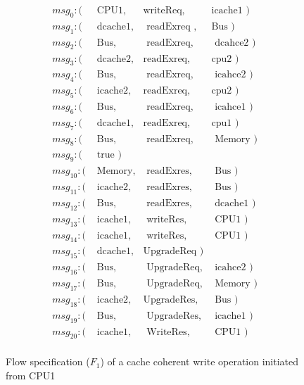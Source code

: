 \documentclass[conference]{IEEEtran}
\begin{document}
\begin{figure}
 {\footnotesize
 \[
 \begin{array}{llll}
 msg_0: (&\mbox{ CPU1},&\mbox{writeReq},&\mbox{icache1   })\\       
 msg_1: (&\mbox{ dcache1},&\mbox{ readExreq },&\mbox{Bus     })\\        
 msg_2: (&\mbox{ Bus},&\mbox{ readExreq},&\mbox{ dcahce2 })\\  
 msg_3: (&\mbox{ dcache2},&\mbox{readExreq},&\mbox{cpu2         })\\   
 msg_4: (&\mbox{ Bus},&\mbox{ readExreq},&\mbox{ icahce2           })\\  
 msg_5: (&\mbox{ icache2},&\mbox{readExreq},&\mbox{cpu2 })\\  
 msg_6: (&\mbox{ Bus},&\mbox{ readExreq},&\mbox{ icahce1       })\\     
 msg_7: (&\mbox{ dcache1},&\mbox{readExreq},&\mbox{cpu1           })\\  
 msg_8: (&\mbox{ Bus},&\mbox{ readExreq},&\mbox{ Memory })\\  
 msg_9: (&\mbox{ true                                          })\\  
 msg_{10}: (&\mbox{ Memory},&\mbox{ readExres},&\mbox{ Bus        })\\  
 msg_{11}: (&\mbox{ icache2},&\mbox{ readExres},&\mbox{ Bus })\\  
 msg_{12}: (&\mbox{ Bus},&\mbox{ readExres},&\mbox{ dcache1        })\\  
 msg_{13}: (&\mbox{ icache1},&\mbox{ writeRes},&\mbox{ CPU1         })\\  
 msg_{14}: (&\mbox{ icache1},&\mbox{ writeRes},&\mbox{ CPU1 })\\  
 msg_{15}: (&\mbox{ dcache1},&\mbox{UpgradeReq             })\\  
 msg_{16}: (&\mbox{ Bus},&\mbox{ UpgradeReq},&\mbox{ icahce2      })\\   
 msg_{17}: (&\mbox{ Bus},&\mbox{ UpgradeReq},&\mbox{ Memory })\\  
 msg_{18}: (&\mbox{ icache2},&\mbox{UpgradeRes},&\mbox{ Bus     })\\  
 msg_{19}: (&\mbox{ Bus},&\mbox{ UpgradeRes},&\mbox{ icache1      })\\  
 msg_{20}: (&\mbox{ icache1},&\mbox{ WriteRes},&\mbox{ CPU1 })\\  
 \end{array}
 \]}
 \caption{Flow specification ($F_1$) of a cache coherent write operation initiated from CPU1}
 \label{write-flow}
 \end{figure}
 
\end{document}
